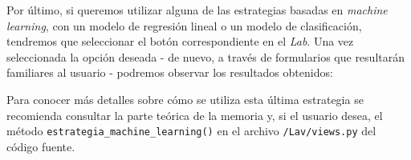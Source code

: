 
Por último, si queremos utilizar alguna de las estrategias basadas en \emph{machine learning}, con un modelo de regresión lineal o un modelo de clasificación, tendremos que seleccionar el botón correspondiente en el \emph{Lab}. Una vez seleccionada la opción deseada - de nuevo, a través de formularios que resultarán familiares al usuario - podremos observar los resultados obtenidos:



Para conocer más detalles sobre cómo se utiliza esta última estrategia se recomienda consultar la parte teórica de la memoria y, si el usuario desea, el método \texttt{estrategia\_machine\_learning()} en el archivo \texttt{/Lav/views.py} del código fuente. 